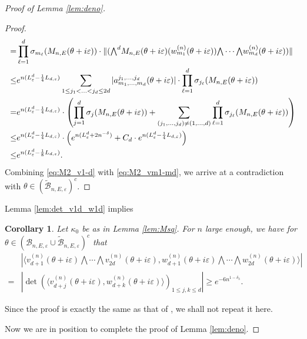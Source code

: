 \documentclass[11pt]{amsart}
\newtheorem{corollary}[theorem]{Corollary}
\begin{document}
\begin{proof}[Proof of Lemma \ref{lem:deno}]
\begin{proof}
\begin{align}
=&\prod_{\ell=1}^d \sigma_{m_{\ell}}(M_{n,E}(\theta+i\varepsilon)) \cdot \|(\textstyle{\bigwedge}^d M_{n,E}(\theta+i\varepsilon) (w_{m_1}^{(n)}(\theta+i\varepsilon))\textstyle{\bigwedge}\cdots \textstyle{\bigwedge} w_{m_d}^{(n)}(\theta+i\varepsilon))\| \notag\\
\leq &e^{n(L^d_{\varepsilon}-\frac{1}{4}L_{d,\varepsilon})} \sum_{1\leq j_1<...<j_d\leq 2d} |a^{j_1,...,j_d}_{m_1,...,m_d}(\theta+i\varepsilon)|\cdot \prod_{\ell=1}^d \sigma_{j_{\ell}}(M_{n,E}(\theta+i\varepsilon))\notag\\
=&e^{n(L^d_{\varepsilon}-\frac{1}{4}L_{d,\varepsilon})} \cdot \left(\prod_{j=1}^d\sigma_j(M_{n,E}(\theta+i\varepsilon))+\sum_{(j_1,...,j_d)\neq (1,...,d)} \prod_{\ell=1}^d\sigma_{j_{\ell}}(M_{n,E}(\theta+i\varepsilon))\right)\notag\\
\leq &e^{n(L^d_{\varepsilon}-\frac{1}{4}L_{d,\varepsilon})} \cdot \left(e^{n(L^d_{\varepsilon}+2n^{-\delta})}+C_d \cdot e^{n(L^d_{\varepsilon}-\frac{1}{4}L_{d,\varepsilon})}\right)\notag\\
\leq &e^{n(L^d_{\varepsilon}-\frac{1}{8}L_{d,\varepsilon})}.
\end{align}
Combining 
\eqref{eq:M2_v1-d} with \eqref{eq:M2_vm1-md}, we arrive at a contradiction with $\theta\in (\tilde{\mathcal{B}}_{n,E,\varepsilon})^c$.
\end{proof}
Lemma \ref{lem:det_v1d_w1d} implies 
\begin{corollary}\label{cor:det_vd+1_2d_w}
    Let $\kappa_0$ be as in Lemma \ref{lem:Msq}. For $n$ large enough, we have for $\theta\in (\mathcal{B}_{n,E,\varepsilon}\cup \tilde{\mathcal{B}}_{n,E,\varepsilon})^c$ that 
    \begin{align}
    &|\langle v_{d+1}^{(n)}(\theta+i\varepsilon)\textstyle{\bigwedge}\cdots \textstyle{\bigwedge} v_{2d}^{(n)}(\theta+i\varepsilon), w_{d+1}^{(n)}(\theta+i\varepsilon)\textstyle{\bigwedge}\cdots \textstyle{\bigwedge} w_{2d}^{(n)}(\theta+i\varepsilon)\rangle|\\
    =&|\det (\langle v_{d+j}^{(n)}(\theta+i\varepsilon), w_{d+k}^{(n)}(\theta+i\varepsilon)\rangle)_{1\leq j,k\leq d}|\geq e^{-6n^{1-\delta_3}}.
\end{align}
\end{corollary}
Since the proof is exactly the same as that of \cite[Corollary 5.12]{HS3}, we shall not repeat it here.

Now we are in position to complete the proof of Lemma \ref{lem:deno}.


\end{proof}
\end{document}
